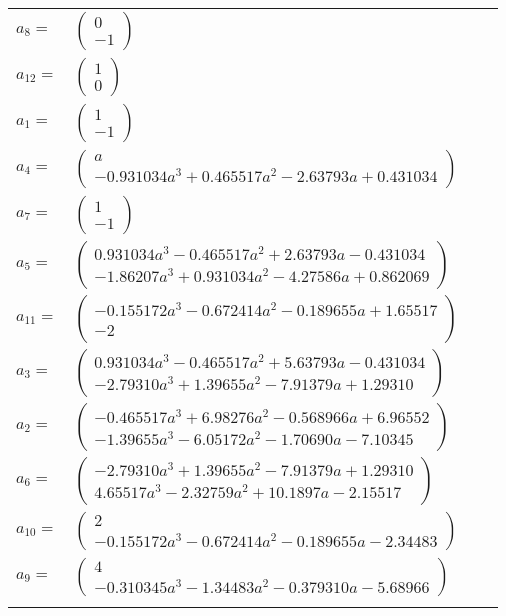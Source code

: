 \documentclass[1p]{elsarticle_modified}
\theoremstyle{definition}
\begin{document}
\begin{tabular}{m{7pt} m{180pt} m{7pt} m{180pt} }
\flushright $a_{8}=$&$\begin{pmatrix}0\\-1\end{pmatrix}$ \\
\flushright $a_{12}=$&$\begin{pmatrix}1\\0\end{pmatrix}$ \\
\flushright $a_{1}=$&$\begin{pmatrix}1\\-1\end{pmatrix}$ \\
\flushright $a_{4}=$&$\begin{pmatrix}a\\-0.931034 a^{3}+0.465517 a^{2}-2.63793 a+0.431034\end{pmatrix}$ \\
\flushright $a_{7}=$&$\begin{pmatrix}1\\-1\end{pmatrix}$ \\
\flushright $a_{5}=$&$\begin{pmatrix}0.931034 a^{3}-0.465517 a^{2}+2.63793 a-0.431034\\-1.86207 a^{3}+0.931034 a^{2}-4.27586 a+0.862069\end{pmatrix}$ \\
\flushright $a_{11}=$&$\begin{pmatrix}-0.155172 a^{3}-0.672414 a^{2}-0.189655 a+1.65517\\-2\end{pmatrix}$ \\
\flushright $a_{3}=$&$\begin{pmatrix}0.931034 a^{3}-0.465517 a^{2}+5.63793 a-0.431034\\-2.79310 a^{3}+1.39655 a^{2}-7.91379 a+1.29310\end{pmatrix}$ \\
\flushright $a_{2}=$&$\begin{pmatrix}-0.465517 a^{3}+6.98276 a^{2}-0.568966 a+6.96552\\-1.39655 a^{3}-6.05172 a^{2}-1.70690 a-7.10345\end{pmatrix}$ \\
\flushright $a_{6}=$&$\begin{pmatrix}-2.79310 a^{3}+1.39655 a^{2}-7.91379 a+1.29310\\4.65517 a^{3}-2.32759 a^{2}+10.1897 a-2.15517\end{pmatrix}$ \\
\flushright $a_{10}=$&$\begin{pmatrix}2\\-0.155172 a^{3}-0.672414 a^{2}-0.189655 a-2.34483\end{pmatrix}$ \\
\flushright $a_{9}=$&$\begin{pmatrix}4\\-0.310345 a^{3}-1.34483 a^{2}-0.379310 a-5.68966\end{pmatrix}$\\&\end{tabular}
\end{document}
